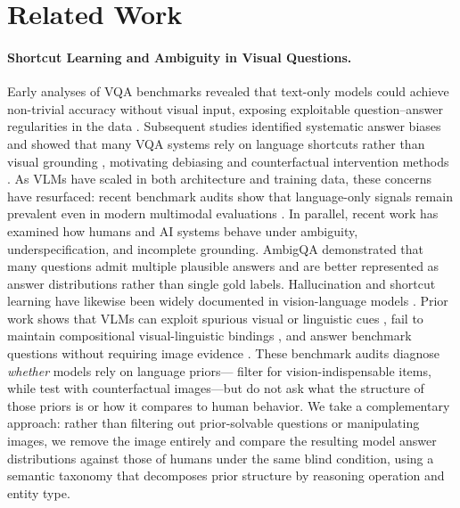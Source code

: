 \documentclass[letterpaper]{article}
\begin{document}
\section{Related Work}

\paragraph{Shortcut Learning and Ambiguity in Visual Questions.}
Early analyses of VQA benchmarks revealed that text-only models could achieve
non-trivial accuracy without visual input, exposing exploitable
question--answer regularities in the data \citep{jabri2016revisiting}.
Subsequent studies identified systematic answer biases
\citep{zhang2016yin} and showed that many VQA systems rely on language
shortcuts rather than visual grounding \citep{agrawal2018dont}, motivating
debiasing and counterfactual intervention methods
\citep{niu2021counterfactual}. As VLMs have scaled in both architecture and
training data, these concerns have resurfaced: recent benchmark audits show
that language-only signals remain prevalent even in modern multimodal
evaluations \citep{chen2024are,lee2024vlind}. In parallel, recent work has examined how
humans and AI systems behave under ambiguity, underspecification, and
incomplete grounding. AmbigQA \citep{min2020ambigqa} demonstrated that many
questions admit multiple plausible answers and are better represented as
answer distributions rather than single gold labels. Hallucination and
shortcut learning have likewise been widely documented in vision-language
models \citep{ji2023survey,rohrbach2018object,xiao2021hallucination}. Prior
work shows that VLMs can exploit spurious visual or linguistic cues
\citep{han2024instinctive,ye2024mmspubench}, fail to maintain compositional
visual-linguistic bindings \citep{yuksekgonul2023when}, and answer benchmark
questions without requiring image evidence \citep{chen2024are,lee2024vlind}.
These benchmark audits diagnose \emph{whether} models rely on language
priors---\citet{chen2024are} filter for vision-indispensable items, while
\citet{lee2024vlind} test with counterfactual images---but do not ask what
the structure of those priors is or how it compares to human behavior.
We take a complementary approach: rather than filtering out prior-solvable
questions or manipulating images, we remove the image entirely and compare
the resulting model answer distributions against those of humans under the
same blind condition, using a semantic taxonomy that decomposes prior
structure by reasoning operation and entity type.
\end{document}
